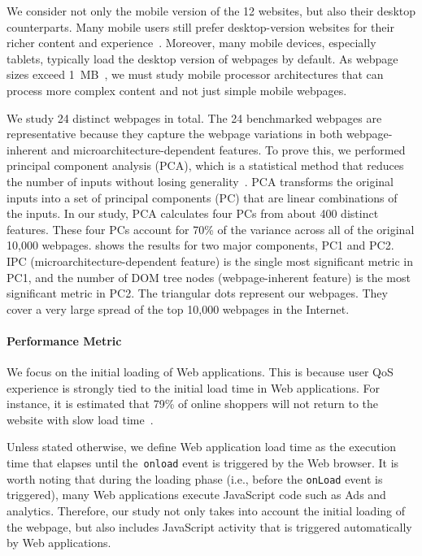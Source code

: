 We consider not only the mobile version of the 12 websites, but also their desktop counterparts. Many mobile users still prefer desktop-version websites for their richer content and experience~\cite{Slocum:2011fk,Bixby:2011uq}. Moreover, many mobile devices, especially tablets, typically load the desktop version of webpages by default. As webpage sizes exceed 1~MB~\cite{Everts:2011kx}, we must study mobile processor architectures that can process more complex content and not just simple mobile webpages.

We study 24 distinct webpages in total. The 24 benchmarked webpages are representative because they capture the webpage variations in both webpage-inherent and microarchitecture-dependent features. To prove this, we performed principal component analysis (PCA), which is a statistical method that reduces the number of inputs without losing generality~\cite{PCA}.  PCA transforms the original inputs into a set of principal components (PC) that are linear combinations of the inputs. In our study, PCA calculates four PCs from about 400 distinct features. These four PCs account for 70\% of the variance across all of the original 10,000 webpages.  shows the results for two major components, PC1 and PC2. IPC (microarchitecture-dependent feature) is the single most significant metric in PC1, and the number of DOM tree nodes (webpage-inherent feature) is the most significant metric in PC2. The triangular dots represent our webpages. They cover a very large spread of the top 10,000 webpages in the Internet.

\paragraph{Performance Metric} We focus on the initial loading of Web applications. This is because user QoS experience is strongly tied to the initial load time in Web applications. For instance, it is estimated that 79\% of online shoppers will not return to the website with slow load time~\cite{Jacob:2013fk}.

Unless stated otherwise, we define Web application load time as the execution time that elapses until the~\texttt{onload} event is triggered by the Web browser. It is worth noting that during the loading phase (i.e., before the \texttt{onLoad} event is triggered), many Web applications execute JavaScript code such as Ads and analytics. Therefore, our study not only takes into account the initial loading of the webpage, but also includes JavaScript activity that is triggered automatically by Web applications.


